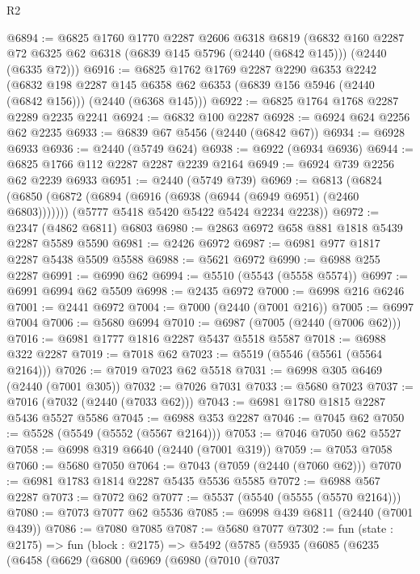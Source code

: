 \begin{lexlean}{R2}
\begin{coremodule}
@6894 := @6825
    @1760
    @1770
    @2287
    @2606
    @6318
    @6819
    (@6832
      @160
      @2287
      @72
      @6325
      @62
      @6318
      (@6839 @145 @5796 (@2440 (@6842 @145)))
      (@2440 (@6335 @72)))
@6916 := @6825
    @1762
    @1769
    @2287
    @2290
    @6353
    @2242
    (@6832
      @198
      @2287
      @145
      @6358
      @62
      @6353
      (@6839 @156 @5946 (@2440 (@6842 @156)))
      (@2440 (@6368 @145)))
@6922 := @6825 @1764 @1768 @2287 @2289 @2235 @2241
@6924 := @6832 @100 @2287
@6928 := @6924 @624 @2256 @62 @2235
@6933 := @6839 @67 @5456 (@2440 (@6842 @67))
@6934 := @6928 @6933
@6936 := @2440 (@5749 @624)
@6938 := @6922 (@6934 @6936)
@6944 := @6825 @1766 @112 @2287 @2287 @2239 @2164
@6949 := @6924 @739 @2256 @62 @2239 @6933
@6951 := @2440 (@5749 @739)
@6969 := @6813
    (@6824
      (@6850 (@6872 (@6894 (@6916 (@6938 (@6944 (@6949 @6951) (@2460 @6803)))))))
      (@5777 @5418 @5420 @5422 @5424 @2234 @2238))
@6972 := @2347 (@4862 @6811) @6803
@6980 := @2863 @6972 @658 @881 @1818 @5439 @2287 @5589 @5590
@6981 := @2426 @6972
@6987 := @6981 @977 @1817 @2287 @5438 @5509 @5588
@6988 := @5621 @6972
@6990 := @6988 @255 @2287
@6991 := @6990 @62
@6994 := @5510 (@5543 (@5558 @5574))
@6997 := @6991 @6994 @62 @5509
@6998 := @2435 @6972
@7000 := @6998 @216 @6246
@7001 := @2441 @6972
@7004 := @7000 (@2440 (@7001 @216))
@7005 := @6997 @7004
@7006 := @5680 @6994
@7010 := @6987 (@7005 (@2440 (@7006 @62)))
@7016 := @6981 @1777 @1816 @2287 @5437 @5518 @5587
@7018 := @6988 @322 @2287
@7019 := @7018 @62
@7023 := @5519 (@5546 (@5561 (@5564 @2164)))
@7026 := @7019 @7023 @62 @5518
@7031 := @6998 @305 @6469 (@2440 (@7001 @305))
@7032 := @7026 @7031
@7033 := @5680 @7023
@7037 := @7016 (@7032 (@2440 (@7033 @62)))
@7043 := @6981 @1780 @1815 @2287 @5436 @5527 @5586
@7045 := @6988 @353 @2287
@7046 := @7045 @62
@7050 := @5528 (@5549 (@5552 (@5567 @2164)))
@7053 := @7046 @7050 @62 @5527
@7058 := @6998 @319 @6640 (@2440 (@7001 @319))
@7059 := @7053 @7058
@7060 := @5680 @7050
@7064 := @7043 (@7059 (@2440 (@7060 @62)))
@7070 := @6981 @1783 @1814 @2287 @5435 @5536 @5585
@7072 := @6988 @567 @2287
@7073 := @7072 @62
@7077 := @5537 (@5540 (@5555 (@5570 @2164)))
@7080 := @7073 @7077 @62 @5536
@7085 := @6998 @439 @6811 (@2440 (@7001 @439))
@7086 := @7080 @7085
@7087 := @5680 @7077
@7302 := fun (state : @2175) =>
  fun (block : @2175) =>
  @5492
    (@5785
      (@5935
        (@6085
          (@6235
            (@6458
              (@6629
                (@6800
                  (@6969
                    (@6980
                      (@7010
                        (@7037

\end{coremodule}
\end{lexlean}
